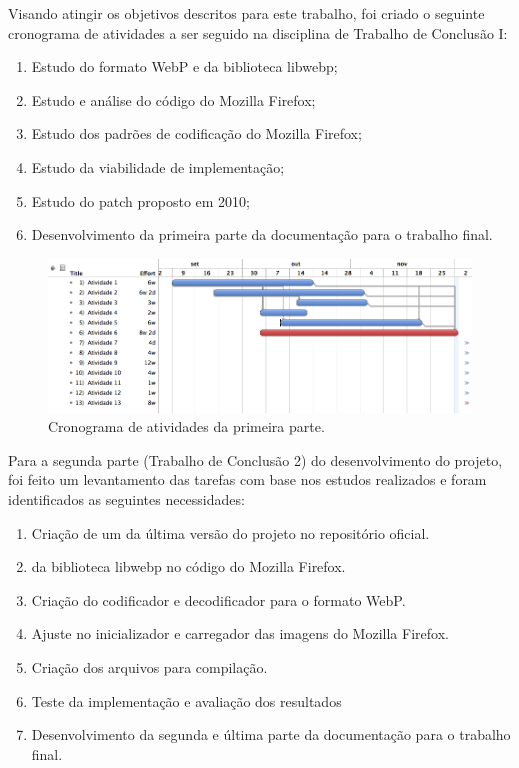 \documentclass[espaco=simples,appendix=Name]{abnt}
\begin{document}
Visando atingir os objetivos descritos para este trabalho, foi criado o seguinte cronograma de atividades a ser seguido na disciplina de Trabalho de Conclusão I:
\begin{enumerate}
	\item Estudo do formato WebP e da biblioteca libwebp;
	\item Estudo e análise do código do Mozilla Firefox;
	\item Estudo dos padrões de codificação do Mozilla Firefox;
	\item Estudo da viabilidade de implementação;
	\item Estudo do patch proposto em 2010;
	\item Desenvolvimento da primeira parte da documentação para o trabalho final.
\end{enumerate}	
		
\begin{figure}[h]
  \centering
    \includegraphics[scale=0.5]{parte1.png}
  \caption{Cronograma de atividades da primeira parte.}
\end{figure}

Para a segunda parte (Trabalho de Conclusão 2) do desenvolvimento do projeto, foi feito um levantamento das tarefas com base nos estudos realizados e foram identificados as seguintes necessidades:
\begin{enumerate}
	\item Criação de um  da última versão do projeto no repositório oficial.
	\item {} da biblioteca libwebp no código do Mozilla Firefox.
	\item Criação do codificador e decodificador para o formato WebP.
	\item Ajuste no inicializador e carregador das imagens do Mozilla Firefox.
	\item Criação dos arquivos para compilação.
	\item Teste da implementação e avaliação dos resultados
	\item Desenvolvimento da segunda e última parte da documentação para o trabalho final.
\end{enumerate}
\end{document}
